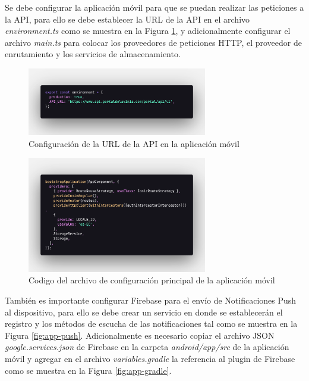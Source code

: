 Se debe configurar la aplicación móvil para que se puedan realizar las peticiones a la API, para ello se debe establecer la URL de la API en el archivo \textit{environment.ts} como se muestra en la Figura \ref{fig:app-environment}, y adicionalmente configurar el archivo \textit{main.ts} para colocar los proveedores de peticiones HTTP, el proveedor de enrutamiento y los servicios de almacenamiento.

\begin{figure}[H]
    \centering
    \includegraphics[width=0.7\textwidth]{resources/images/app-env}
    \caption{Configuración de la URL de la API en la aplicación móvil}
    \label{fig:app-environment}
\end{figure}

\begin{figure}[H]
    \centering
    \includegraphics[width=0.7\textwidth]{resources/images/app-main}
    \caption{Codigo del archivo de configuración principal de la aplicación móvil}
    \label{fig:app-main}
\end{figure}

También es importante configurar Firebase para el envío de Notificaciones Push al dispositivo, para ello se debe crear un servicio en donde se establecerán el registro y los métodos de escucha de las notificaciones tal como se muestra en la Figura \ref{fig:app-push}.
Adicionalmente es necesario copiar el archivo JSON \textit{google.services.json} de Firebase en la carpeta \textit{android/app/src} de la aplicación móvil y agregar en el archivo \textit{variables.gradle} la referencia al plugin de Firebase como se muestra en la Figura \ref{fig:app-gradle}.

